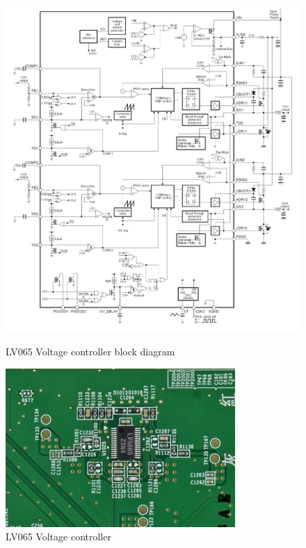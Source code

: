 \documentclass[11pt,a4paper,titlepage]{article}
\begin{document}
      \begin{figure}[h]
        \begin{minipage}{.9\textwidth}
          \includegraphics[width = \textwidth]{LV5065_block_diag.png}
          \caption{LV065 Voltage controller block diagram}
          \label{fig:LV5065bd}
        \end{minipage}
        \vspace{5mm}
        \begin{minipage}{.6 \textwidth}
          \includegraphics[width = .95\textwidth]{LV5065.png}
          \caption{LV065 Voltage controller}
          \label{fig:LV5065}
        \end{minipage}
      \end{figure}
\end{document}
